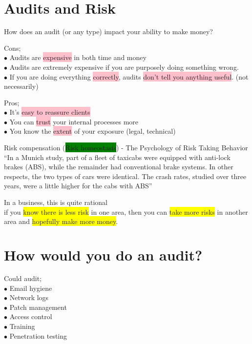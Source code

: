 \documentclass[tikz,border=10pt]{project_plan}
\newcommand{\bulletPoint}{\hspace{-3.1pt}$\bullet$ \hspace{5pt}}
\begin{document}
\section{Audits and Risk}

How does an audit (or any type) impact your ability to make money?

Cons;\\
\bulletPoint Audits are \colorbox{pink}{expensive} in both time and money \\
\bulletPoint Audits are extremely expensive if you are purposely doing something wrong. \\
\bulletPoint If you are doing everything \colorbox{pink}{correctly}, audits \colorbox{pink}{don’t tell you anything useful}. (not necessarily)

Pros;\\
\bulletPoint It’s \colorbox{pink}{easy to reassure clients} \\
\bulletPoint You can \colorbox{pink}{trust} your internal processes more\\
\bulletPoint You know the \colorbox{pink}{extent} of your exposure (legal, technical)

Risk compensation (\colorbox{green}{Risk homeostasis}) - The Psychology of Risk Taking Behavior\\
“In a Munich study, part of a fleet of taxicabs were equipped with anti-lock
brakes (ABS), while the remainder had conventional brake systems. In other
respects, the two types of cars were identical. The crash rates, studied over
three years, were a little higher for the cabs with ABS”

In a business, this is quite rational\\
if you \colorbox{yellow}{know there is less risk} in one area, then you can \colorbox{yellow}{take more risks} in
another area and \colorbox{yellow}{hopefully make more money}.

\newpage

\section{How would you do an audit?}

Could audit;\\
\bulletPoint Email hygiene\\
\bulletPoint Network logs \\
\bulletPoint Patch management \\
\bulletPoint Access control \\
\bulletPoint Training \\
\bulletPoint Penetration testing
\end{document}

